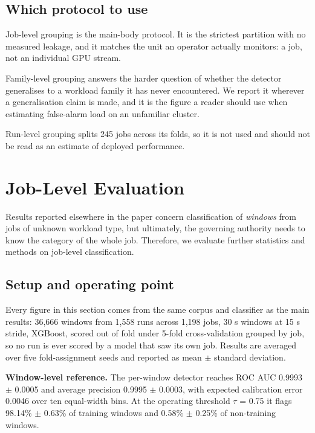 \subsection{Which protocol to use}

Job-level grouping is the main-body protocol. It is the strictest partition with no measured leakage, and it matches the unit an operator actually monitors: a job, not an individual GPU stream.

Family-level grouping answers the harder question of whether the detector generalises to a workload family it has never encountered. We report it wherever a generalisation claim is made, and it is the figure a reader should use when estimating false-alarm load on an unfamiliar cluster.

Run-level grouping splits 245 jobs across its folds, so it is not used and should not be read as an estimate of deployed performance.

\FloatBarrier
\section{Job-Level Evaluation}
\label{sec:joblevel}

Results reported elsewhere in the paper concern classification of \emph{windows} from jobs of unknown workload type, but ultimately, the governing authority needs to know the category of the whole job. Therefore, we evaluate further statistics and methods on job-level classification.

\subsection{Setup and operating point}

Every figure in this section comes from the same corpus and classifier as the main results: 36,666 windows from 1,558 runs across 1,198 jobs, 30 s windows at 15 s stride, XGBoost, scored out of fold under 5-fold cross-validation grouped by job, so no run is ever scored by a model that saw its own job. Results are averaged over five fold-assignment seeds and reported as mean $\pm$ standard deviation.

\textbf{Window-level reference.} The per-window detector reaches ROC AUC 0.9993 $\pm$ 0.0005 and average precision 0.9995 $\pm$ 0.0003, with expected calibration error 0.0046 over ten equal-width bins. At the operating threshold $\tau$ = 0.75 it flags 98.14\% $\pm$ 0.63\% of training windows and 0.58\% $\pm$ 0.25\% of non-training windows.

